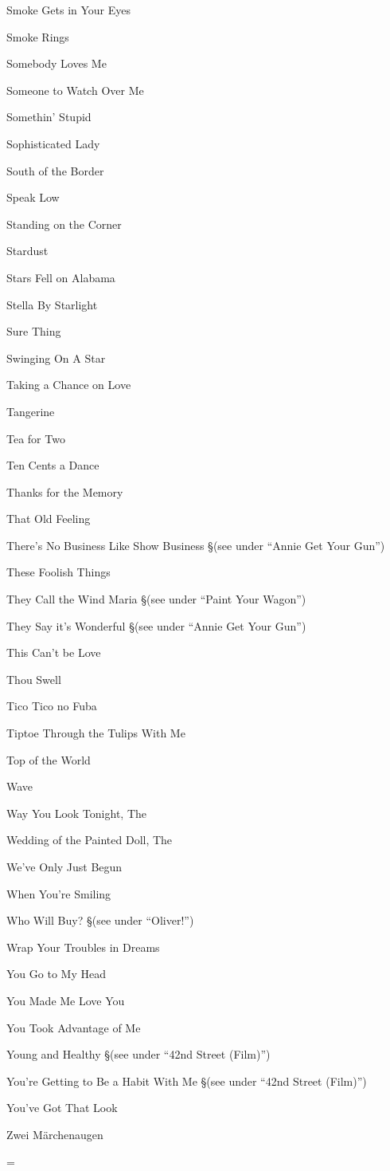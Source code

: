 \N Smoke Gets in Your Eyes

\N Smoke Rings

\N Somebody Loves Me

\N Someone to Watch Over Me

\N Somethin' Stupid

\N Sophisticated Lady

\N South of the Border

\N Speak Low

\N Standing on the Corner

\N Stardust

\N Stars Fell on Alabama

\N Stella By Starlight

\N Sure Thing

\N Swinging On A Star

\N Taking a Chance on Love

\N Tangerine

\N Tea for Two

\N Ten Cents a Dance

\N Thanks for the Memory

\N That Old Feeling

\N There's No Business Like Show Business
\nobreak
\S (see under ``Annie Get Your Gun'')

\N These Foolish Things

\N They Call the Wind Maria
\nobreak
\S (see under ``Paint Your Wagon'')

\N They Say it's Wonderful
\nobreak
\S (see under ``Annie Get Your Gun'')

\N This Can't be Love

\N Thou Swell

\N Tico Tico no Fuba

\N Tiptoe Through the Tulips With Me

\N Top of the World

\N Wave

\N Way You Look Tonight, The

\N Wedding of the Painted Doll, The

\N We've Only Just Begun

\N When You're Smiling

\N Who Will Buy?
\nobreak
\S (see under ``Oliver!'')

\N Wrap Your Troubles in Dreams

\N You Go to My Head

\N You Made Me Love You

\N You Took Advantage of Me

\N Young and Healthy
\nobreak
\S (see under ``42nd Street (Film)'')

\N You're Getting to Be a Habit With Me
\nobreak
\S (see under ``42nd Street (Film)'')

\N You've Got That Look

\N Zwei M{\"a}rchenaugen

\singlecolumn
\vfil\eject
\ifseparate
\else
\pagecnt=\pageno
\fi
\endinput

